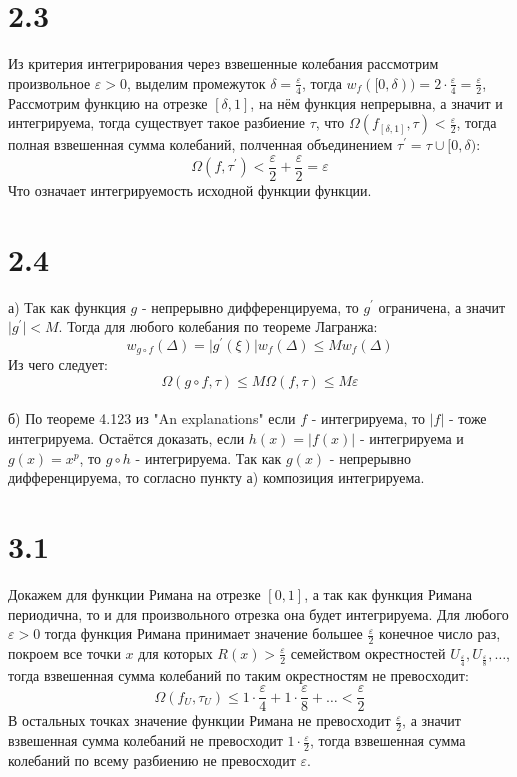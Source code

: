 \documentclass[12pt]{article}
\begin{document}
\section{2.3}
Из критерия интегрирования через взвешенные колебания рассмотрим произвольное 
$\varepsilon > 0$, выделим промежуток $\delta = \frac{\varepsilon}{4}$, тогда $w_f([0, \delta)) = 2 \cdot \frac{\varepsilon}{4} = \frac{\varepsilon}{2}$, 
Рассмотрим функцию на отрезке $[\delta, 1]$, на нём функция непрерывна, а значит и интегрируема, тогда 
существует такое разбиение $\tau$, что $\Omega(f_{[\delta, 1]}, \tau) < \frac{\varepsilon}{2}$, тогда полная 
взвешенная сумма колебаний, полченная объединением $\tau^{\prime} = \tau \cup [0, \delta)$: 
\[
    \Omega(f, \tau^{\prime}) < \frac{\varepsilon}{2} + \frac{\varepsilon}{2} = \varepsilon
\]      
Что означает интегрируемость исходной функции функции. 
\section{2.4}
а) Так как функция $g$ - непрерывно дифференцируема, то $g^{\prime}$ ограничена, а значит $\vert g^{\prime} \vert < M$. 
Тогда для любого колебания по теореме Лагранжа: 
\[
    w_{g \circ f}(\Delta) = \vert g^{\prime}(\xi) \vert w_f(\Delta) \leq M w_f(\Delta)
\]    
Из чего следует: 
\[
    \Omega(g \circ f, \tau) \leq M \Omega(f, \tau) \leq M \varepsilon
\]
\\б) 
По теореме 4.123 из "An explanations" если $f$ - интегрируема, то $\vert f \vert $ - тоже интегрируема. 
Остаётся доказать, если $h(x) = \vert f(x) \vert $ - интегрируема и $g(x) = x^p$, то $g \circ h$ - интегрируема. 
Так как $g(x)$ - непрерывно дифференцируема, то согласно пункту а) композиция интегрируема.        
\section{3.1}
Докажем для функции Римана на отрезке $[0, 1]$, а так как функция Римана периодична, то и для произвольного 
отрезка она будет интегрируема. 
Для любого $\varepsilon > 0$ тогда функция Римана принимает значение большее $\frac{\varepsilon}{2}$ конечное число раз, 
покроем все точки $x$ для которых $R(x) > \frac{\varepsilon}{2}$ семейством окрестностей $U_{\frac{\varepsilon}{4}}, U_{\frac{\varepsilon}{8}}, \dots$, 
тогда взвешенная сумма колебаний по таким окрестностям не превосходит: 
\[
    \Omega(f_U, \tau_U) \leq 1\cdot\frac{\varepsilon}{4} + 1\cdot\frac{\varepsilon}{8} + \dots < \frac{\varepsilon}{2}
\]   
В остальных точках значение функции Римана не превосходит $\frac{\varepsilon}{2}$, а значит взвешенная сумма колебаний 
не превосходит $1\cdot\frac{\varepsilon}{2}$, тогда взвешенная сумма колебаний по всему разбиению не превосходит $\varepsilon$.    
\end{document}
